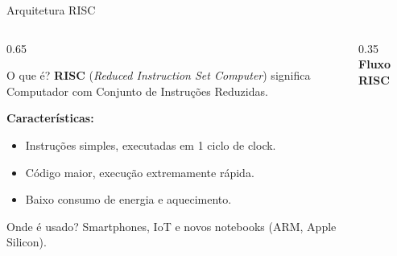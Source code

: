 \documentclass[aspectratio=169]{beamer}
\begin{document}
\begin{frame}{Arquitetura RISC}
    \begin{columns}[T]
        \begin{column}{0.65\textwidth}
            \begin{block}{O que é?}
                \textbf{RISC} (\textit{Reduced Instruction Set Computer}) significa Computador com Conjunto de Instruções Reduzidas.
            \end{block}
            \vspace{0.4em}
            \textbf{Características:}
            \begin{itemize}
                \item Instruções simples, executadas em 1 ciclo de clock.
                \item Código maior, execução extremamente rápida.
                \item Baixo consumo de energia e aquecimento.
            \end{itemize}
            \vspace{0.4em}
            \begin{exampleblock}{Onde é usado?}
                Smartphones, IoT e novos notebooks (ARM, Apple Silicon).
            \end{exampleblock}
        \end{column}
        \begin{column}{0.35\textwidth}
            \centering
            \textbf{Fluxo RISC}
            \vspace{0.5em}
            
        \end{column}
    \end{columns}
\end{frame}
\end{document}

